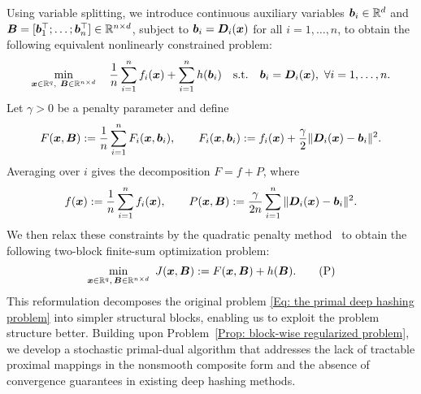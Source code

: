 Using variable splitting, we introduce continuous auxiliary variables \(\bm{b}_i\in\mathbb{R}^d\) and \(\bm{B}=[\bm{b}_1^\top;\ldots;\bm{b}_n^\top]\in\mathbb{R}^{n\times d}\), subject to \(\bm{b}_i=\bm{D}_i(\bm{x})\) for all \(i=1,\dots,n\), to obtain the following equivalent nonlinearly constrained problem: 
\begin{align}
    \min_{\bm{x} \in \mathbb{R}^{q},\ \bm{B} \in \mathbb{R}^{n\times d}}\quad \frac{1}{n}\sum_{i=1}^{n} f_i(\bm{x})+\sum_{i=1}^{n}h(\bm{b}_i)\quad \text{s.t.}\quad \bm{b}_i=\bm{D}_i(\bm{x}),\ \forall i=1,\dots,n. \notag
\end{align}
Let \(\gamma>0\) be a penalty parameter and define
\begin{align}
    F(\bm{x},\bm{B}):= \frac{1}{n}\sum_{i=1}^{n}F_i(\bm{x},\bm{b}_i),\qquad F_i(\bm{x},\bm{b}_i):= f_i(\bm{x})+\frac{\gamma}{2}\|\bm{D}_i(\bm{x})-\bm{b}_i\|^2. \notag
\end{align}
Averaging over \(i\) gives the decomposition \(F=f+P\), where
\begin{align}
    f(\bm{x}):= \frac{1}{n}\sum_{i=1}^{n}f_i(\bm{x}),\qquad P(\bm{x},\bm{B}):= \frac{\gamma}{2n}\sum_{i=1}^{n}\|\bm{D}_i(\bm{x})-\bm{b}_i\|^2. \notag
\end{align}
We then relax these constraints by the quadratic penalty method~\cite[Sec.~17.1]{nocedalWright2006} to obtain the following two-block finite-sum optimization problem:
\begin{align}
    \label{Prop: block-wise regularized problem}
    \min_{\bx \in \RR^{q},\,\bB \in \RR^{n\times d}}\ J(\bx,\bB):=F(\bx,\bB)+h(\bB). \tag{P}
\end{align} This reformulation decomposes the original problem \eqref{Eq: the primal deep hashing problem} into simpler structural blocks, enabling us to exploit the problem structure better. Building upon Problem~\eqref{Prop: block-wise regularized problem}, we develop a stochastic primal-dual algorithm that addresses the lack of tractable proximal mappings in the nonsmooth composite form and the absence of convergence guarantees in existing deep hashing methods.
